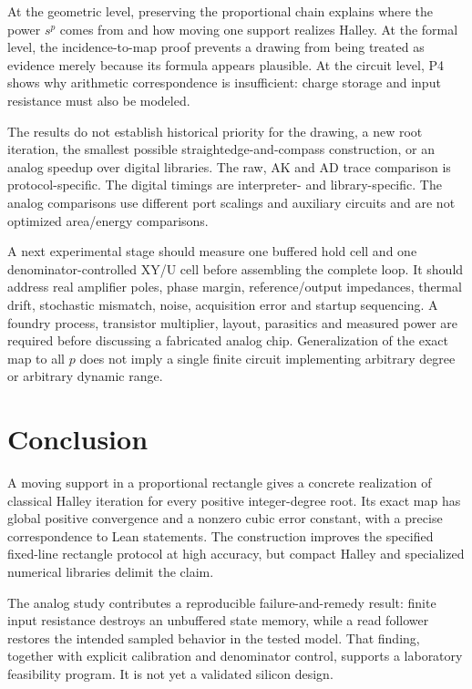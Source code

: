 \documentclass[11pt,a4paper]{article}
\theoremstyle{remark}\newtheorem{remark}[theorem]{Remark}
\numberwithin{equation}{section}
\begin{document}
At the geometric level, preserving the proportional chain explains where the power $s^p$ comes from and how moving one support realizes Halley. At the formal level, the incidence-to-map proof prevents a drawing from being treated as evidence merely because its formula appears plausible. At the circuit level, P4 shows why arithmetic correspondence is insufficient: charge storage and input resistance must also be modeled.

The results do not establish historical priority for the drawing, a new root iteration, the smallest possible straightedge-and-compass construction, or an analog speedup over digital libraries. The raw, AK and AD trace comparison is protocol-specific. The digital timings are interpreter- and library-specific. The analog comparisons use different port scalings and auxiliary circuits and are not optimized area/energy comparisons.

A next experimental stage should measure one buffered hold cell and one denominator-controlled XY/U cell before assembling the complete loop. It should address real amplifier poles, phase margin, reference/output impedances, thermal drift, stochastic mismatch, noise, acquisition error and startup sequencing. A foundry process, transistor multiplier, layout, parasitics and measured power are required before discussing a fabricated analog chip. Generalization of the exact map to all $p$ does not imply a single finite circuit implementing arbitrary degree or arbitrary dynamic range.

\section{Conclusion}
A moving support in a proportional rectangle gives a concrete realization of classical Halley iteration for every positive integer-degree root. Its exact map has global positive convergence and a nonzero cubic error constant, with a precise correspondence to Lean statements. The construction improves the specified fixed-line rectangle protocol at high accuracy, but compact Halley and specialized numerical libraries delimit the claim.

The analog study contributes a reproducible failure-and-remedy result: finite input resistance destroys an unbuffered state memory, while a read follower restores the intended sampled behavior in the tested model. That finding, together with explicit calibration and denominator control, supports a laboratory feasibility program. It is not yet a validated silicon design.
\end{document}
